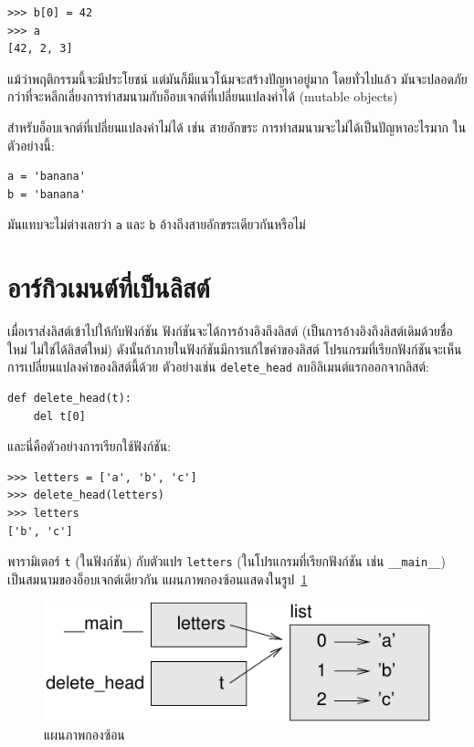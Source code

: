 \begin{verbatim}
>>> b[0] = 42
>>> a
[42, 2, 3]
\end{verbatim}
%
แม้ว่าพฤติกรรมนี้จะมีประโยชน์
แต่มันก็มีแนวโน้มจะสร้างปัญหาอยู่มาก
โดยทั่วไปแล้ว มันจะปลอดภัยกว่าที่จะหลีกเลี่ยงการทำสมนามกับอ็อบเจกต์ที่เปลี่ยนแปลงค่าได้ (mutable objects)

สำหรับอ็อบเจกต์ที่เปลี่ยนแปลงค่าไม่ได้ เช่น สายอักขระ
การทำสมนามจะไม่ได้เป็นปัญหาอะไรมาก
ในตัวอย่างนี้:

\begin{verbatim}
a = 'banana'
b = 'banana'
\end{verbatim}
%
มันแทบจะไม่ต่างเลยว่า \texttt{a} และ \texttt{b} อ้างถึงสายอักขระเดียวกันหรือไม่

\section{อาร์กิวเมนต์ที่เป็นลิสต์}
\label{list.arguments}

เมื่อเราส่งลิสต์เข้าไปให้กับฟังก์ชัน
ฟังก์ชันจะได้การอ้างอิงถึงลิสต์ (เป็นการอ้างอิงถึงลิสต์เดิมด้วยชื่อใหม่ ไม่ใช่ได้ลิสต์ใหม่)
ดังนั้นถ้าภายในฟังก์ชันมีการแก้ไขค่าของลิสต์
โปรแกรมที่เรียกฟังก์ชันจะเห็นการเปลี่ยนแปลงค่าของลิสต์นี้ด้วย
ตัวอย่างเช่น \verb|delete_head| ลบอิลิเมนต์แรกออกจากลิสต์:

\begin{verbatim}
def delete_head(t):
    del t[0]
\end{verbatim}
%
และนี่คือตัวอย่างการเรียกใช้ฟังก์ชัน:
%
\begin{verbatim}
>>> letters = ['a', 'b', 'c']
>>> delete_head(letters)
>>> letters
['b', 'c']
\end{verbatim}
%
พารามิเตอร์ \texttt{t} (ในฟังก์ชัน) กับตัวแปร \texttt{letters} (ในโปรแกรมที่เรียกฟังก์ชัน เช่น \verb|__main__|) เป็นสมนามของอ็อบเจกต์เดียวกัน
แผนภาพกองซ้อนแสดงในรูป~\ref{fig.stack5}

\begin{figure}
\centerline
{\includegraphics[scale=0.8]{figs/stack5.pdf}}
\caption{แผนภาพกองซ้อน}
\label{fig.stack5}
\end{figure}

